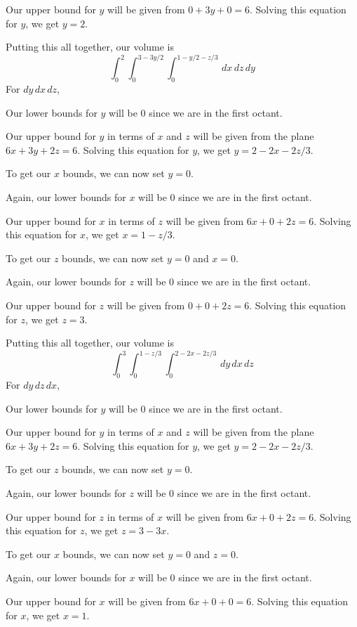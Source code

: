\documentclass{article}
\begin{document}
Our upper bound for $y$ will be given from $0+3y+0=6$. Solving this equation for $y$, we get $y=2$.

Putting this all together, our volume is
\begin{equation*}
    \int_0^2\int_0^{3-3y/2}\int_0^{1-y/2-z/3}\,dx\,dz\,dy
\end{equation*}
For $dy\,dx\,dz$,

Our lower bounds for $y$ will be $0$ since we are in the first octant.

Our upper bound for $y$ in terms of $x$ and $z$ will be given from the plane $6x+3y+2z=6$. Solving this equation for $y$, we get $y=2-2x-2z/3$.

To get our $x$ bounds, we can now set $y=0$.

Again, our lower bounds for $x$ will be $0$ since we are in the first octant.

Our upper bound for $x$ in terms of $z$ will be given from $6x+0+2z=6$. Solving this equation for $x$, we get $x=1-z/3$.

To get our $z$ bounds, we can now set $y=0$ and $x=0$.

Again, our lower bounds for $z$ will be $0$ since we are in the first octant.

Our upper bound for $z$ will be given from $0+0+2z=6$. Solving this equation for $z$, we get $z=3$.

Putting this all together, our volume is
\begin{equation*}
    \int_0^3\int_0^{1-z/3}\int_0^{2-2x-2z/3}\,dy\,dx\,dz
\end{equation*}
For $dy\,dz\,dx$,

Our lower bounds for $y$ will be $0$ since we are in the first octant.

Our upper bound for $y$ in terms of $x$ and $z$ will be given from the plane $6x+3y+2z=6$. Solving this equation for $y$, we get $y=2-2x-2z/3$.

To get our $z$ bounds, we can now set $y=0$.

Again, our lower bounds for $z$ will be $0$ since we are in the first octant.

Our upper bound for $z$ in terms of $x$ will be given from $6x+0+2z=6$. Solving this equation for $z$, we get $z=3-3x$.

To get our $x$ bounds, we can now set $y=0$ and $z=0$.

Again, our lower bounds for $x$ will be $0$ since we are in the first octant.

Our upper bound for $x$ will be given from $6x+0+0=6$. Solving this equation for $x$, we get $x=1$.
\end{document}
